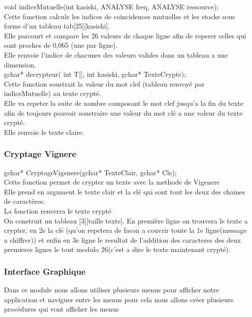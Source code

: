 \documentclass[a4]{article}
\begin{document}
	void indiceMutuelle(int kasiski, ANALYSE freq, ANALYSE ressource);\\
		Cette fonction calcule les indices de coïncidences mutuelles et les stocke sous forme d'un tableau tab[25][kasiski].\\
		Elle parcourt et compare les 26 valeurs de chaque ligne afin de reperer celles qui sont proches de 0,065 (une par ligne).\\
		Elle renvoie l'indice de chacunes des valeurs valides dans un tableau a une dimension. \\
	
	gchar* decrypteur( int T[], int kasiski, gchar* TexteCrypte);\\
		Cette fonction soustrait la valeur du mot clef (tableau renvoyé par indiceMutuelle) au texte crypté.\\
		Elle va repeter la suite de nombre composant le mot clef jusqu'a la fin du texte afin de toujours pouvoir
		soustraire une valeur du mot clé a une valeur du texte crypté.\\
		Elle renvoie le texte claire.\\
		
		\subsubsection{Cryptage Vignere}
	gchar* CryptageVigenere(gchar* TexteClair, gchar* Cle);\\
		Cette fonction permet de crypter un texte avec la methode de Vigenere\\
		Elle prend en argument le texte clair et la clé qui sont tout les deux des chaines de caractères.\\
		La fonction renverra le texte crypté\\
		On construit un tableau [3][taille texte]. En première ligne on trouvera le texte a crypter, 
		en 2e la clé (qu'on repetera de facon a couvrir toute la 1e ligne(message a chiffrer)) et enfin 
		en 3e ligne le resultat de l'addition des caracteres des deux premieres lignes le tout modulo 
		26(c'est a dire le texte maintenant crypté).
		
		\subsubsection{Interface Graphique}
		Dans ce module nous allons utiliser plusieurs menus pour afficher notre application et naviguer 
		entre les menus pour cela nous allons créer plusieurs procédures qui vont afficher les menus  
		
\end{document}
